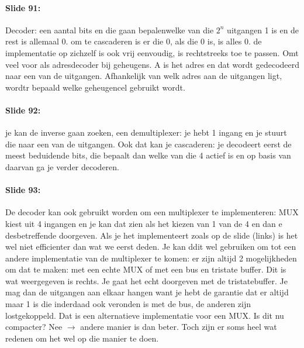 \documentclass[10pt,a4paper]{book}
\begin{document}
\paragraph{Slide 91:} Decoder: een aantal bits en die gaan bepalenwelke van die $2^n$ uitgangen 1 is en de rest is allemaal 0. om te cascaderen is er die 0, als die 0 is, is alles 0. de implementatie op zichzelf is ook vrij eenvoudig, is rechtstreeks toe te passen. Omt veel voor als adresdecoder bij geheugens. A is het adres en dat wordt gedecodeerd naar een van de uitgangen. Afhankelijk van welk adres aan de uitgangen ligt, wordtr bepaald welke geheugencel gebruikt wordt.

\paragraph{Slide 92:} je kan de inverse gaan zoeken, een demultiplexer: je hebt 1 ingang en je stuurt die naar een van de uitgangen. Ook dat kan je cascaderen: je decodeert eerst de meest beduidende bits, die bepaalt dan welke van die 4 actief is en op basis van daarvan ga je verder decoderen.

\paragraph{Slide 93:} De decoder kan ook gebruikt worden om een multiplexer te implementeren: MUX kiest uit 4 ingangen en je kan dat zien als het kiezen van 1 van de 4 en dan e desbetreffende doorgeven. Als je het implementeert zoals op de slide (links) is het wel niet efficienter dan wat we eerst deden. Je kan ddit wel gebruiken om tot een andere implementatie van de multiplexer te komen: er zijn altijd 2 mogelijkheden om dat te maken: met een echte MUX of met een bus en tristate buffer. Dit is wat weergegeven is rechts. Je gaat het echt doorgeven met de tristatebuffer. Je mag dan de uitgangen aan elkaar hangen want je hebt de garantie dat er altijd maar 1 is die inderdaad ook veronden is met de bus, de anderen zijn lostgekoppeld. Dat is een alternatieve implementatie voor een MUX. Is dit nu compacter? Nee $\rightarrow$ andere manier is dan beter. Toch zijn er soms heel wat redenen om het wel op die manier te doen.
\end{document}
